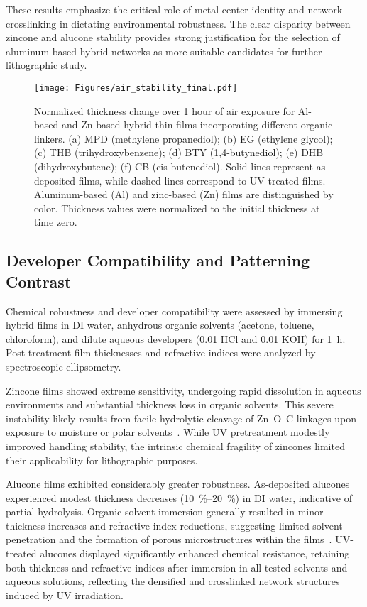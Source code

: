 These results emphasize the critical role of metal center identity and network crosslinking in dictating environmental robustness. The clear disparity between zincone and alucone stability provides strong justification for the selection of aluminum-based hybrid networks as more suitable candidates for further lithographic study.

\begin{figure}[H]
  \centering
  \texttt{[image: Figures/air\_stability\_final.pdf]}
    \caption{\small
    Normalized thickness change over 1 hour of air exposure for Al-based and Zn-based hybrid thin films incorporating different organic linkers. (a) MPD (methylene propanediol); (b) EG (ethylene glycol); (c) THB (trihydroxybenzene); (d) BTY (1,4-butynediol); (e) DHB (dihydroxybutene); (f) CB (cis-butenediol).
    Solid lines represent as-deposited films, while dashed lines correspond to UV-treated films. Aluminum-based (Al) and zinc-based (Zn) films are distinguished by color. Thickness values were normalized to the initial thickness at time zero.
    }
    \label{fig:air_stability}
\end{figure}


\subsection{Developer Compatibility and Patterning Contrast}

Chemical robustness and developer compatibility were assessed by immersing hybrid films in DI water, anhydrous organic solvents (acetone, toluene, chloroform), and dilute aqueous developers (\SI{0.01}{\molar} HCl and \SI{0.01}{\molar} KOH) for \SI{1}{\hour}. Post-treatment film thicknesses and refractive indices were analyzed by spectroscopic ellipsometry.

Zincone films showed extreme sensitivity, undergoing rapid dissolution in aqueous environments and substantial thickness loss in organic solvents. This severe instability likely results from facile hydrolytic cleavage of Zn--O--C linkages upon exposure to moisture or polar solvents~\cite{King2009}. While UV pretreatment modestly improved handling stability, the intrinsic chemical fragility of zincones limited their applicability for lithographic purposes.

Alucone films exhibited considerably greater robustness. As-deposited alucones experienced modest thickness decreases (\SIrange{10}{20}{\percent}) in DI water, indicative of partial hydrolysis. Organic solvent immersion generally resulted in minor thickness increases and refractive index reductions, suggesting limited solvent penetration and the formation of porous microstructures within the films~\cite{Vemuri2008}. UV-treated alucones displayed significantly enhanced chemical resistance, retaining both thickness and refractive indices after immersion in all tested solvents and aqueous solutions, reflecting the densified and crosslinked network structures induced by UV irradiation.

